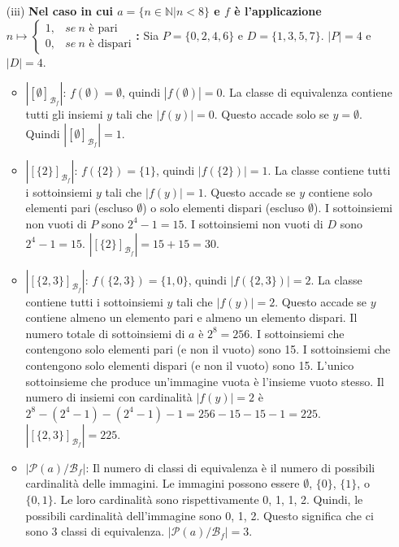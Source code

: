 \begin{itemize}
    \item[(iii)] \textbf{Nel caso in cui $a=\{n\in\mathbb{N}|n<8\}$ e $f$ è l'applicazione $n\mapsto\begin{cases}1,&se~n\text{ è pari}\\ 0,&se~n\text{ è dispari}\end{cases}$:}
    Sia $P=\{0,2,4,6\}$ e $D=\{1,3,5,7\}$. $|P|=4$ e $|D|=4$.
    \begin{itemize}
        \item \textbf{$|[\emptyset]_{\mathcal{B}_{f}}| $}: $f(\emptyset) = \emptyset$, quindi $|f(\emptyset)|=0$. La classe di equivalenza contiene tutti gli insiemi $y$ tali che $|f(y)|=0$. Questo accade solo se $y=\emptyset$. Quindi $|[\emptyset]_{\mathcal{B}_{f}}|=1$.
        \item \textbf{$|[\{2\}]_{\mathcal{B}_{f}}| $}: $f(\{2\}) = \{1\}$, quindi $|f(\{2\})|=1$. La classe contiene tutti i sottoinsiemi $y$ tali che $|f(y)|=1$. Questo accade se $y$ contiene solo elementi pari (escluso $\emptyset$) o solo elementi dispari (escluso $\emptyset$).
        I sottoinsiemi non vuoti di $P$ sono $2^4-1=15$.
        I sottoinsiemi non vuoti di $D$ sono $2^4-1=15$.
        $|[\{2\}]_{\mathcal{B}_{f}}| = 15+15=30$.
        \item \textbf{$|[\{2,3\}]_{\mathcal{B}_{f}}|$}: $f(\{2,3\}) = \{1,0\}$, quindi $|f(\{2,3\})|=2$. La classe contiene tutti i sottoinsiemi $y$ tali che $|f(y)|=2$. Questo accade se $y$ contiene almeno un elemento pari e almeno un elemento dispari.
        Il numero totale di sottoinsiemi di $a$ è $2^8=256$.
        I sottoinsiemi che contengono solo elementi pari (e non il vuoto) sono 15.
        I sottoinsiemi che contengono solo elementi dispari (e non il vuoto) sono 15.
        L'unico sottoinsieme che produce un'immagine vuota è l'insieme vuoto stesso.
        Il numero di insiemi con cardinalità $|f(y)|=2$ è $2^8 - (2^4-1) - (2^4-1) - 1 = 256 - 15 - 15 - 1 = 225$.
        $|[\{2,3\}]_{\mathcal{B}_{f}}|=225$.
        \item \textbf{$|\mathcal{P}(a)/\mathcal{B}_{f}|$}: Il numero di classi di equivalenza è il numero di possibili cardinalità delle immagini. Le immagini possono essere $\emptyset$, $\{0\}$, $\{1\}$, o $\{0,1\}$. Le loro cardinalità sono rispettivamente 0, 1, 1, 2. Quindi, le possibili cardinalità dell'immagine sono 0, 1, 2. Questo significa che ci sono 3 classi di equivalenza.
        $|\mathcal{P}(a)/\mathcal{B}_{f}|=3$.
    \end{itemize}
\end{itemize}

